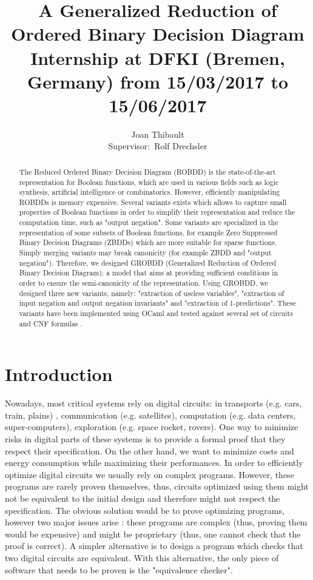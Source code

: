 \documentclass[a4paper,10pt]{article}
\title{A Generalized Reduction of Ordered Binary Decision Diagram\\{\small Internship at DFKI (Bremen, Germany) from 15/03/2017 to 15/06/2017}}
\author{Joan Thibault\\Supervisor:~Rolf Drechsler}
\begin{document}
\maketitle
\begin{abstract}
The Reduced Ordered Binary Decision Diagram (ROBDD)\cite{Bryant1986, Somenzi1999} is the state-of-the-art representation for Boolean functions, which are used in various fields such as logic synthesis, artificial intelligence or combinatorics.
However, efficiently manipulating ROBDDs is memory expensive.
Several variants exists which allows to capture small properties of Boolean functions in order to simplify their representation and reduce the computation time, such as "output negation".
Some variants are specialized in the representation of some subsets of Boolean functions, for example Zero Suppressed Binary Decision Diagrams (ZBDDs) which are more suitable for sparse functions.
Simply merging variants may break canonicity (for example ZBDD and "output negation").
Therefore, we designed GROBDD (Generalized Reduction of Ordered Binary Decision Diagram): a model that aims at providing sufficient conditions in order to ensure the semi-canonicity of the representation.
Using GROBDD, we designed three new variants, namely: "extraction of useless variables", "extraction of input negation and output negation invariants" and "extraction of 1-predictions".
These variants have been implemented using OCaml \cite{DAGamlGitHub} and tested against several set of circuits \cite{BenchSatlib, BenchLgsynth91} and CNF formulas \cite{BenchIscas99}.
\end{abstract}

\newpage

\section{Introduction}

Nowadays, most critical systems rely on digital circuits: in transports (e.g. cars, train, plains) , communication (e.g. satellites), computation (e.g. data centers, super-computers), exploration (e.g. space rocket, rovers).
One way to minimize risks in digital parts of these systems is to provide a formal proof that they respect their specification.
On the other hand, we want to minimize costs and energy consumption while maximizing their performances.
In order to efficiently optimize digital circuits we usually rely on complex programs.
However, these programs are rarely proven themselves, thus, circuits optimized using them might not be equivalent to the initial design and therefore might not respect the specification.
The obvious solution would be to prove optimizing programs, however two major issues arise : these programs are complex  (thus, proving them would be expensive) and might be proprietary (thus, one cannot check that the proof is correct).
A simpler alternative is to design a program which checks that two digital circuits are equivalent.
With this alternative, the only piece of software that needs to be proven is the "equivalence checker".
\end{document}

